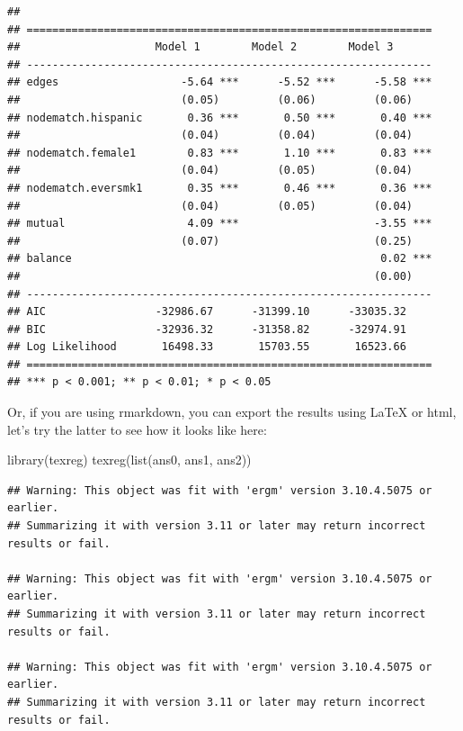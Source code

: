 \documentclass[
]{book}
\newenvironment{Shaded}{\begin{snugshade}}{\end{snugshade}}
\newcommand{\FunctionTok}[1]{\textcolor[rgb]{0.00,0.00,0.00}{#1}}
\newcommand{\NormalTok}[1]{#1}
\begin{document}
\begin{verbatim}
## 
## ===============================================================
##                     Model 1        Model 2        Model 3      
## ---------------------------------------------------------------
## edges                   -5.64 ***      -5.52 ***      -5.58 ***
##                         (0.05)         (0.06)         (0.06)   
## nodematch.hispanic       0.36 ***       0.50 ***       0.40 ***
##                         (0.04)         (0.04)         (0.04)   
## nodematch.female1        0.83 ***       1.10 ***       0.83 ***
##                         (0.04)         (0.05)         (0.04)   
## nodematch.eversmk1       0.35 ***       0.46 ***       0.36 ***
##                         (0.04)         (0.05)         (0.04)   
## mutual                   4.09 ***                     -3.55 ***
##                         (0.07)                        (0.25)   
## balance                                                0.02 ***
##                                                       (0.00)   
## ---------------------------------------------------------------
## AIC                 -32986.67      -31399.10      -33035.32    
## BIC                 -32936.32      -31358.82      -32974.91    
## Log Likelihood       16498.33       15703.55       16523.66    
## ===============================================================
## *** p < 0.001; ** p < 0.01; * p < 0.05
\end{verbatim}

Or, if you are using rmarkdown, you can export the results using LaTeX or html, let's try the latter to see how it looks like here:

\begin{Shaded}
\begin{Highlighting}[]
\FunctionTok{library}\NormalTok{(texreg)}
\FunctionTok{texreg}\NormalTok{(}\FunctionTok{list}\NormalTok{(ans0, ans1, ans2))}
\end{Highlighting}
\end{Shaded}

\begin{verbatim}
## Warning: This object was fit with 'ergm' version 3.10.4.5075 or earlier.
## Summarizing it with version 3.11 or later may return incorrect results or fail.

## Warning: This object was fit with 'ergm' version 3.10.4.5075 or earlier.
## Summarizing it with version 3.11 or later may return incorrect results or fail.

## Warning: This object was fit with 'ergm' version 3.10.4.5075 or earlier.
## Summarizing it with version 3.11 or later may return incorrect results or fail.
\end{verbatim}
\end{document}
